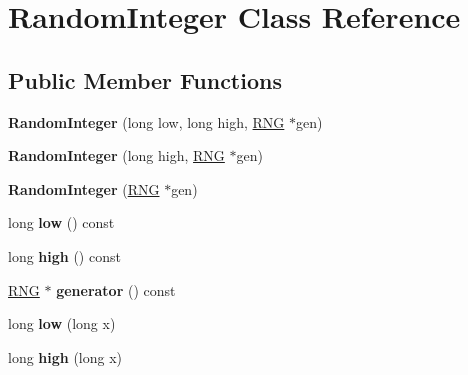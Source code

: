 \hypertarget{classRandomInteger}{}\section{Random\+Integer Class Reference}
\label{classRandomInteger}
\subsection*{Public Member Functions}
\begin{DoxyCompactItemize}
\item 
\mbox{\label{classRandomInteger_a84024399aee48f6f4aa29457f54b3c49}} 
{\bfseries Random\+Integer} (long low, long high, \hyperlink{classRNG}{R\+NG} $\ast$gen)
\item 
\mbox{\label{classRandomInteger_a275ed177219519619705c1d87d8e996d}} 
{\bfseries Random\+Integer} (long high, \hyperlink{classRNG}{R\+NG} $\ast$gen)
\item 
\mbox{\label{classRandomInteger_a7509364abe41d81d110cf876bffd02a5}} 
{\bfseries Random\+Integer} (\hyperlink{classRNG}{R\+NG} $\ast$gen)
\item 
\mbox{\label{classRandomInteger_ab6bd52ad235f9dde28cf7bf5b31662c6}} 
long {\bfseries low} () const
\item 
\mbox{\label{classRandomInteger_a73dbed313ac77cacde98dfb41d7ad303}} 
long {\bfseries high} () const
\item 
\mbox{\label{classRandomInteger_a4046802f9fbfddf31ffcb1f5ae48ecba}} 
\hyperlink{classRNG}{R\+NG} $\ast$ {\bfseries generator} () const
\item 
\mbox{\label{classRandomInteger_a78ad8e517f54ecf722fc8710201af682}} 
long {\bfseries low} (long x)
\item 
\mbox{\label{classRandomInteger_a2b734b02907d9b653942a9d7b9848798}} 
long {\bfseries high} (long x)
\item 
\mbox{\label{classRandomInteger_a8123bd4ef387083c981f6dc782e8dc6e}} 

\end{DoxyCompactItemize}
